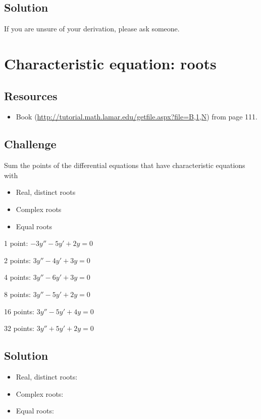 \subsection*{Solution}
If you are unsure of your derivation, please ask someone.

\timebox




\newpage
\section{Characteristic equation: roots}

\subsection*{Resources}
\begin{itemize}
    \item Book (\url{http://tutorial.math.lamar.edu/getfile.aspx?file=B,1,N}) from page 111.
\end{itemize}

\subsection*{Challenge}
Sum the points of the differential equations that have characteristic equations with
\begin{itemize}
    \item Real, distinct roots
    \item Complex roots
    \item Equal roots
\end{itemize}

1 point: $\displaystyle -3 y'' - 5 y' + 2 y = 0$ %

2 points: $\displaystyle 3 y'' - 4 y' + 3 y = 0$ %

4 points: $\displaystyle 3 y'' - 6 y' + 3 y = 0$ %

8 points: $\displaystyle 3 y'' - 5 y' + 2 y = 0$ %

16 points: $\displaystyle 3 y'' - 5 y' + 4 y = 0$ %

32 points: $\displaystyle 3 y'' + 5 y' + 2 y = 0$ %

\subsection*{Solution}

\begin{itemize}
    \item Real, distinct roots: 
    \item Complex roots: 
    \item Equal roots: 
\end{itemize}

